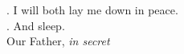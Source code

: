 \begin{Parallel}[v]{\colw}{\colx}
{}
{\vern
{\noindent
\Vbar. I will both lay me down in peace.\\
\Rbar. And sleep.\\
Our Father, \textit{in secret}}}

\end{Parallel}




